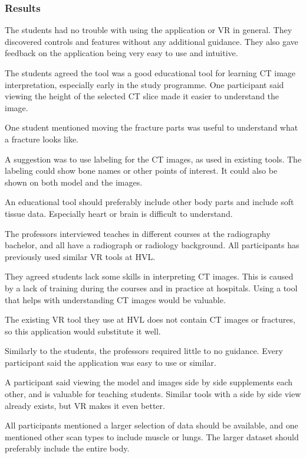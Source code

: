 \documentclass[a4paper]{report}
\begin{document}
\subsubsection{Results}
The students had no trouble with using the application or VR in general. They discovered controls and features without any additional guidance. They also gave feedback on the application being very easy to use and intuitive.

The students agreed the tool was a good educational tool for learning CT image interpretation, especially early in the study programme.
One participant said viewing the height of the selected CT slice made it easier to understand the image.

One student mentioned moving the fracture parts was useful to understand what a fracture looks like.

A suggestion was to use labeling for the CT images, as used in existing tools. The labeling could show bone names or other points of interest. It could also be shown on both model and the images.

An educational tool should preferably include other body parts and include soft tissue data. Especially heart or brain is difficult to understand.


The professors interviewed teaches in different courses at the radiography bachelor, and all have a radiograph or radiology background. 
All participants has previously used similar VR tools at HVL.

They agreed students lack some skills in interpreting CT images. This is caused by a lack of training during the courses and in practice at hospitals. Using a tool that helps with understanding CT images would be valuable. 

The existing VR tool they use at HVL does not contain CT images or fractures, so this application would substitute it well.

Similarly to the students, the professors required little to no guidance. Every participant said the application was easy to use or similar.

A participant said viewing the model and images side by side supplements each other, and is valuable for teaching students. Similar tools with a side by side view already exists, but VR makes it even better.

All participants mentioned a larger selection of data should be available, and one mentioned other scan types to include muscle or lungs. The larger dataset should preferably include the entire body.
\end{document}
